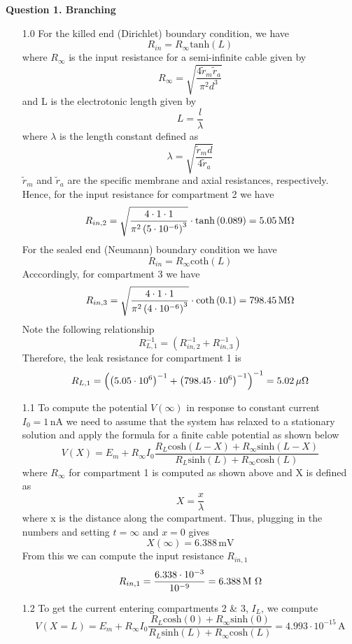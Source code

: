 \documentclass[12pt]{article}
\begin{document}
\noindent


\noindent\textbf{Question 1. Branching}
\begin{enumerate}
    \item[1.0] For the killed end (Dirichlet) boundary condition, we have
    $$R_{in} =  R_{\infty} \text{tanh}(L)$$
    where $R_{\infty}$ is the input resistance for a semi-infinite cable given by
    $$R_{\infty} = \sqrt{\frac{4\tilde{r}_{m}\tilde{r}_{a}}{\pi^{2}d^{3}}}$$
    and L is the electrotonic length given by 
    $$L = \frac{l}{\lambda}$$
    where $\lambda$ is the length constant defined as
    $$\lambda = \sqrt{\frac{\tilde{r}_{m}d}{4\tilde{r}_{a}}}$$
    $\tilde{r}_{m}$ and $\tilde{r}_{a}$ are the specific membrane and axial resistances, respectively. Hence, for the input resistance for compartment 2 we have
    $$R_{in,2} = \sqrt{\frac{4\cdot 1\cdot 1}{\pi^{2}\left(5\cdot 10^{-6}\right)^{3}}}\cdot \text{tanh}\left(0.089\right) = 5.05 \, \text{M\si{\ohm}}$$
    For the sealed end (Neumann) boundary condition we have
    $$R_{in} =  R_{\infty} \text{coth}(L)$$
    Acccordingly, for compartment 3 we have
    $$R_{in,3} = \sqrt{\frac{4\cdot 1\cdot 1}{\pi^{2}\left(4\cdot 10^{-6}\right)^{3}}}\cdot \text{coth}\left(0.1\right) = 798.45 \, \text{M\si{\ohm}}$$
    Note the following relationship
    $$R_{L,1}^{-1} = \left(R_{in,2}^{-1} + R_{in,3}^{-1}\right)$$
    Therefore, the leak resistance for compartment 1 is
    $$R_{L,1} = \left(\left(5.05\cdot 10^{6}\right)^{-1} + \left(798.45\cdot 10^{6}\right)^{-1}\right)^{-1} = 5.02 \, \mu \text{\si{\ohm}}$$
    \item[1.1] To compute the potential $V(\infty)$ in response to constant current $I_{0}=1 \, \text{nA}$ we need to assume that the system has relaxed to a stationary solution and apply the formula for a finite cable potential as shown below
    $$V(X) = E_{m} + R_{\infty}I_{0}\frac{R_{L}\text{cosh}\left(L-X\right) + R_{\infty}\text{sinh}\left(L-X\right)}{R_{L}\text{sinh}\left(L\right) + R_{\infty}\text{cosh}\left(L\right)}$$
    where $R_{\infty}$ for compartment 1 is computed as shown above and X is defined as 
    $$X = \frac{x}{\lambda}$$
    where x is the distance along the compartment. Thus, plugging in the numbers and setting $t=\infty$ and $x=0$ gives
    $$X(\infty) = 6.388 \, \text{mV}$$
    From this we can compute the input resistance $R_{in, 1}$
    $$R_{in, 1} = \frac{6.338\cdot 10^{-3}}{10^{-9}} = 6.388 \, \text{M \si{\ohm}}$$
    \item[1.2] To get the current entering compartments 2 \& 3, $I_{L}$, we compute
    $$V(X=L) = E_{m} + R_{\infty}I_{0}\frac{R_{L}\text{cosh}\left(0\right) + R_{\infty}\text{sinh}\left(0\right)}{R_{L}\text{sinh}\left(L\right) + R_{\infty}\text{cosh}\left(L\right)} = 4.993\cdot 10^{-15} \, \text{A}$$

\end{enumerate}
\end{document}
